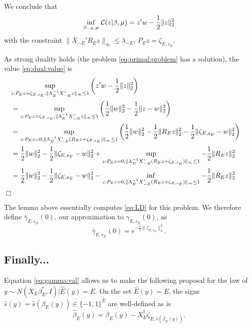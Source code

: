 \documentclass{article}
\newcommand{\OLS}{\bar{\beta}}
\newcommand{\REG}{\hat{\beta}}
\def\qed{\hfill $\Box$\newline}
\begin{document}
        We conclude that
        $$ \inf_{\beta_{-E},\mu}{\cal L}(z|\beta,\mu) = z'w -
        \frac{1}{2}\|z\|^2_2
        $$ with the constraint $\|X_{-E}'R_Ez\|_{\infty} \leq
        \lambda_{-E}$, $P_Ez=\zeta_{E,s_E}$.

        As strong duality holds (the problem \eqref{eq:primal:problem}
        has a solution), the value \eqref{eq:dual:value} is
        $$
        \begin{aligned}
          \lefteqn{\sup_{z: P_Ez=\zeta_{E,s_E},
              \|\Lambda_E^{-1}X_{-E}'z\|_{\infty} \leq 1} \left(z'w -
            \frac{1}{2}\|z\|^2_2 \right)} \\ &= \sup_{z:
            P_Ez=\zeta_{E,s_E}, \|\Lambda_E^{-1}X_{-E}'z\|_{\infty}
            \leq 1} \left( \frac{1}{2}\|w\|^2_2 -
          \frac{1}{2}\|z-w\|^2_2 \right) \\ &= \sup_{z: P_Ez=0,
            \|\Lambda_E^{-1}X_{-E}'(R_Ez+\zeta_{E,s_E})\|_{\infty}
            \leq 1} \left( \frac{1}{2}\|w\|^2_2 -
          \frac{1}{2}\|R_Ez\|^2_2 - \frac{1}{2}\|\zeta_{E,s_E}-w\|^2_2
          \right) \\ &= \frac{1}{2} \|w\|^2_2 -
          \frac{1}{2}\|\zeta_{E,s_E}-w\|^2_2 + \sup_{z: P_Ez=0,
            \|\Lambda_E^{-1}X_{-E}'(R_Ez+\zeta_{E,s_E})\|_{\infty}
            \leq 1} -\frac{1}{2}\|R_Ez\|^2_2 \\ &= \frac{1}{2}
          \|w\|^2_2 - \frac{1}{2}\|\zeta_{E,s_E}-w\|^2_2 - \inf_{z:
            P_Ez=0,
            \|\Lambda_E^{-1}X_{-E}'(R_Ez+\zeta_{E,s_E})\|_{\infty}
            \leq 1} -\frac{1}{2}\|R_Ez\|^2_2 \\
        \end{aligned}
        $$ \qed

        The lemma above essentially computes \eqref{eq:LD} for this
        problem.  We therefore define $\bar{\gamma}_{E,s_E}(0)$, our
        approximation to $\gamma_{E,s_E}(0)$, as
        \begin{equation}
          \label{eq:gamma:val}
          \bar{\gamma}_{E,s_E}(0) =
          e^{-\frac{1}{2}\|\zeta_{E,s_E}\|^2_2}.
          \end{equation}

        \subsection{Finally...}

        Equation \eqref{eq:gamma:val} allows us to make the following proposal for the
        law of $y \sim N(X_E\beta_E^*, I) | \hat{E}(y)=E$. On the set
        $\hat{E}(y)=E$, the signs $\hat{s}(y) = \hat{s}(\beta_E(y)) \in \{-1,1\}^E$ are well-defined as is
        $$
        \REG_E(y) = \OLS_E(y) - X_E^{\dagger}\zeta_{E,\hat{s}(\OLS_E(y))}.
        $$
\end{document}
